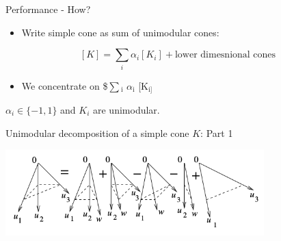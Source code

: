 \documentclass[8pt]{beamer}
\begin{document}
\begin{frame}[label=sec-12]{Performance - How?}
\begin{itemize}
\item Write simple cone as sum of unimodular cones:
\end{itemize}
$$[K] = \sum_i \alpha_i [K_i]+ \text{lower dimesnional cones}$$ 

\begin{itemize}
\item We concentrate on \$$\sum$$_{\text{i}}$ $\alpha$$_{\text{i}}$ [K$_{\text{i]}}$
\end{itemize}
\begin{center}
    $\alpha_i \in \{ -1, 1 \}$  and $K_i$ are unimodular.
\end{center}
\end{frame}



\begin{frame}[label=sec-13]{Unimodular decomposition of a simple cone $K$: Part 1}
\begin{center}
\includegraphics[width=10cm, keepaspectratio]{res/simple-cone-into-unimodular-cones}
\end{center}
\end{frame}
\end{document}
